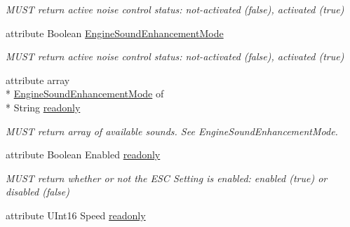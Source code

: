 \begin{DoxyCompactItemize}
\begin{DoxyCompactList}\small\item\em M\+U\+S\+T return active noise control status\+: not-\/activated (false), activated (true) \end{DoxyCompactList}\item 
\hypertarget{interfaceVehiclePropertyType_a5b7585bb847ccfc1ea5b10dafdb86860}{attribute Boolean \hyperlink{interfaceVehiclePropertyType_a5b7585bb847ccfc1ea5b10dafdb86860}{Engine\+Sound\+Enhancement\+Mode}}\label{interfaceVehiclePropertyType_a5b7585bb847ccfc1ea5b10dafdb86860}

\begin{DoxyCompactList}\small\item\em M\+U\+S\+T return active noise control status\+: not-\/activated (false), activated (true) \end{DoxyCompactList}\item 
\hypertarget{interfaceVehiclePropertyType_a7a391be9018ad8415ff5462f4e4dae7b}{attribute array \\*
\hyperlink{interfaceVehiclePropertyType_a5b7585bb847ccfc1ea5b10dafdb86860}{Engine\+Sound\+Enhancement\+Mode} of \\*
String \hyperlink{interfaceVehiclePropertyType_a7a391be9018ad8415ff5462f4e4dae7b}{readonly}}\label{interfaceVehiclePropertyType_a7a391be9018ad8415ff5462f4e4dae7b}

\begin{DoxyCompactList}\small\item\em M\+U\+S\+T return array of available sounds. See Engine\+Sound\+Enhancement\+Mode. \end{DoxyCompactList}\item 
\hypertarget{interfaceVehiclePropertyType_aa93e3186f8f9f1b43561f94cc33df444}{attribute Boolean Enabled \hyperlink{interfaceVehiclePropertyType_aa93e3186f8f9f1b43561f94cc33df444}{readonly}}\label{interfaceVehiclePropertyType_aa93e3186f8f9f1b43561f94cc33df444}

\begin{DoxyCompactList}\small\item\em M\+U\+S\+T return whether or not the E\+S\+C Setting is enabled\+: enabled (true) or disabled (false) \end{DoxyCompactList}\item 
\hypertarget{interfaceVehiclePropertyType_a781f1d7f5ee07c0eb4e99da26365f215}{attribute U\+Int16 Speed \hyperlink{interfaceVehiclePropertyType_a781f1d7f5ee07c0eb4e99da26365f215}{readonly}}\label{interfaceVehiclePropertyType_a781f1d7f5ee07c0eb4e99da26365f215}


\end{DoxyCompactItemize}
